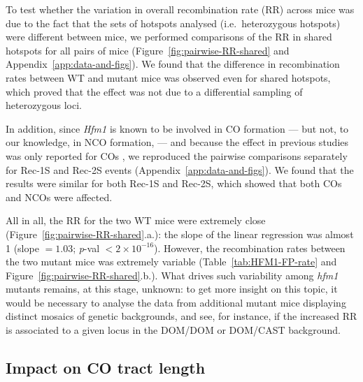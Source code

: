 To test whether the variation in overall recombination rate (RR) across mice was due to the fact that the sets of hotspots analysed (i.e.\ heterozygous hotspots) were different between mice, we performed comparisons of the RR in shared hotspots for all pairs of mice (Figure~\ref{fig:pairwise-RR-shared} and Appendix~\ref{app:data-and-figs}).
We found that the difference in recombination rates between WT and mutant mice was observed even for shared hotspots, which proved that the effect was not due to a differential sampling of heterozygous loci.

In addition, since \textit{Hfm1} is known to be involved in CO formation \citep{mazina2004saccharomyces} — but not, to our knowledge, in NCO formation, — and because the effect in previous studies was only reported for COs \citep{guiraldelli2013mouse,mercier2005two,borner2004crossover}, we reproduced the pairwise comparisons separately for Rec-1S and Rec-2S events (Appendix~\ref{app:data-and-figs}).
We found that the results were similar for both Rec-1S and Rec-2S, which showed that both COs and NCOs were affected.

All in all, the RR for the two WT mice were extremely close (Figure~\ref{fig:pairwise-RR-shared}.a.): the slope of the linear regression was almost 1 (slope $=1.03$; \textit{p}-val $<2 \times 10^{-16}$).
However, the recombination rates between the two mutant mice was extremely variable (Table~\ref{tab:HFM1-FP-rate} and Figure~\ref{fig:pairwise-RR-shared}.b.).
What drives such variability among \textit{hfm1} mutants remains, at this stage, unknown: to get more insight on this topic, it would be necessary to analyse the data from additional mutant mice displaying distinct mosaics of genetic backgrounds, and see, for instance, if the increased RR is associated to a given locus in the DOM/DOM or DOM/CAST background.


\subsection{Impact on CO tract length}


